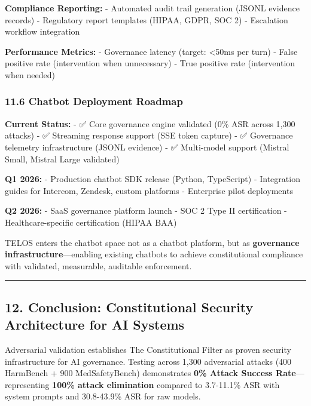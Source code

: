 \textbf{Compliance Reporting:} - Automated audit trail generation (JSONL
evidence records) - Regulatory report templates (HIPAA, GDPR, SOC 2) -
Escalation workflow integration

\textbf{Performance Metrics:} - Governance latency (target:
\textless50ms per turn) - False positive rate (intervention when
unnecessary) - True positive rate (intervention when needed)

\subsubsection{11.6 Chatbot Deployment
Roadmap}\label{chatbot-deployment-roadmap}

\textbf{Current Status:} - ✅ Core governance engine validated (0\% ASR
across 1,300 attacks) - ✅ Streaming response support (SSE token
capture) - ✅ Governance telemetry infrastructure (JSONL evidence) - ✅
Multi-model support (Mistral Small, Mistral Large validated)

\textbf{Q1 2026:} - Production chatbot SDK release (Python, TypeScript)
- Integration guides for Intercom, Zendesk, custom platforms -
Enterprise pilot deployments

\textbf{Q2 2026:} - SaaS governance platform launch - SOC 2 Type II
certification - Healthcare-specific certification (HIPAA BAA)

TELOS enters the chatbot space not as a chatbot platform, but as
\textbf{governance infrastructure}---enabling existing chatbots to
achieve constitutional compliance with validated, measurable, auditable
enforcement.

\begin{center}\rule{0.5\linewidth}{0.5pt}\end{center}

\subsection{12. Conclusion: Constitutional Security Architecture for AI
Systems}\label{conclusion-constitutional-security-architecture-for-ai-systems}

Adversarial validation establishes The Constitutional Filter as proven
security infrastructure for AI governance. Testing across 1,300
adversarial attacks (400 HarmBench + 900 MedSafetyBench) demonstrates
\textbf{0\% Attack Success Rate}---representing \textbf{100\% attack
elimination} compared to 3.7-11.1\% ASR with system prompts and
30.8-43.9\% ASR for raw models.

